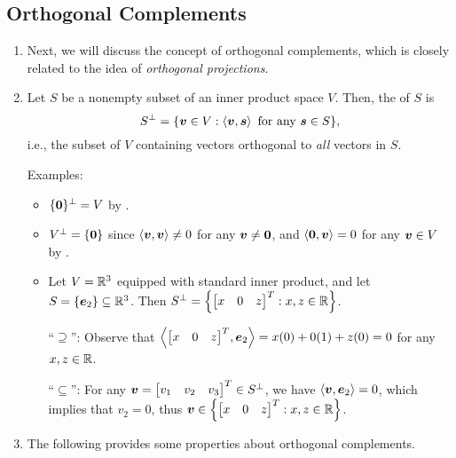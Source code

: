 \subsection{Orthogonal Complements}
\begin{enumerate}
\item Next, we will discuss the concept of orthogonal complements, which is
closely related to the idea of \emph{orthogonal projections}.
\item Let \(S\) be a nonempty subset of an inner product space \(V\). Then, the
 of \(S\) is
\[
S^{\perp}=\{\vb*{v}\in V:\left\langle \vb*{v},\vb*{s}\right\rangle\text{ for any }\vb*{s}\in S\},
\]
i.e., the subset of \(V\) containing vectors orthogonal to \emph{all} vectors
in \(S\).

Examples:
\begin{itemize}
\item \(\{\vb*{0}\}^{\perp}=V\) by .
\item \(V^{\perp}=\{\vb*{0}\}\) since \(\left\langle \vb*{v},\vb*{v}\right\rangle\ne 0\) for
any \(\vb*{v}\ne\vb*{0}\), and \(\left\langle \vb*{0},\vb*{v}\right\rangle=0\) for any
\(\vb*{v}\in V\) by .
\item Let \(V=\mathbb{R}^3\) equipped with standard inner product, and let
\(S=\{\vb*{e}_2\}\subseteq \mathbb{R}^3\). Then
\(S^{\perp}=\qty{\mqty[x&0&z]^{T}:x,z\in\R}\).


\begin{pf}
``\(\supseteq\)'': Observe that
\(\inner{\mqty[x&0&z]^{T}}{\vect{e}_2}=x(0)+0(1)+z(0)=0\) for any \(x,z\in\mathbb{R}\).

``\(\subseteq\)'': For any \(\vect{v}=\mqty[v_1&v_2&v_3]^{T}\in S^{\perp}\), we
have \(\left\langle \vb*{v},\vb*{e}_2\right\rangle=0\), which implies that \(v_2=0\), thus
\(\vect{v}\in \qty{\mqty[x&0&z]^{T}:x,z\in\R}\).
\end{pf}
\end{itemize}
\item The following provides some properties about orthogonal complements.


\end{enumerate}
